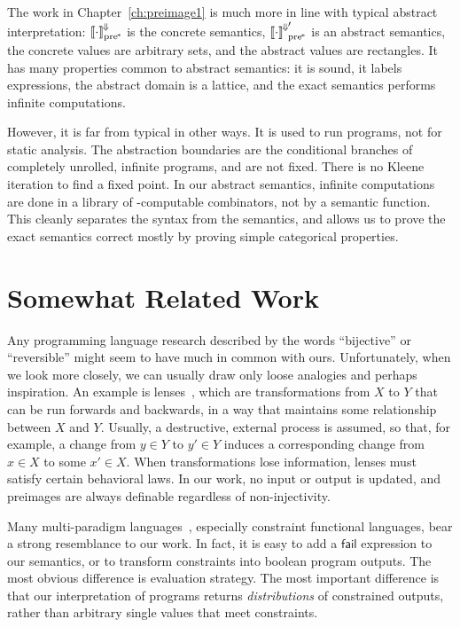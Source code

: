 The work in Chapter~\ref{ch:preimage1} is much more in line with typical abstract interpretation: $\left\llbracket{\cdot}\right\rrbracket^{\mspace{-2mu}\Downarrow\mspace{-2mu}}_\mathrm{pre^{\mspace{-2mu}*}}$ is the concrete semantics, ${\left\llbracket{\cdot}\right\rrbracket^{\mspace{-2mu}\Downarrow\mspace{-2mu}}}_\mathrm{pre^{\mspace{-2mu}*}}'$ is an abstract semantics, the concrete values are arbitrary sets, and the abstract values are rectangles.
It has many properties common to abstract semantics: it is sound, it labels expressions, the abstract domain is a lattice, and the exact semantics performs infinite computations.

However, it is far from typical in other ways.
It is used to run programs, not for static analysis.
The abstraction boundaries are the conditional branches of completely unrolled, infinite programs, and are not fixed.
There is no Kleene iteration to find a fixed point.
In our abstract semantics, infinite computations are done in a library of \lzfclang-computable combinators, not by a semantic function.
This cleanly separates the syntax from the semantics, and allows us to prove the exact semantics correct mostly by proving simple categorical properties.



\section{Somewhat Related Work}

Any programming language research described by the words ``bijective'' or ``reversible'' might seem to have much in common with ours.
Unfortunately, when we look more closely, we can usually draw only loose analogies and perhaps inspiration.
An example is lenses~\cite{cit:hofmann-2012popl-edit-lenses}, which are transformations from $X$ to $Y$ that can be run forwards and backwards, in a way that maintains some relationship between $X$ and $Y$.
Usually, a destructive, external process is assumed, so that, for example, a change from $y \in Y$ to $y' \in Y$ induces a corresponding change from $x \in X$ to some $x' \in X$.
When transformations lose information, lenses must satisfy certain behavioral laws.
In our work, no input or output is updated, and preimages are always definable regardless of non-injectivity.

Many multi-paradigm languages~\cite{cit:hanus-2007lp-multi-paradigm}, especially constraint functional languages, bear a strong resemblance to our work.
In fact, it is easy to add a $\mathsf{fail}$ expression to our semantics, or to transform constraints into boolean program outputs.
The most obvious difference is evaluation strategy.
The most important difference is that our interpretation of programs returns \emph{distributions} of constrained outputs, rather than arbitrary single values that meet constraints.

